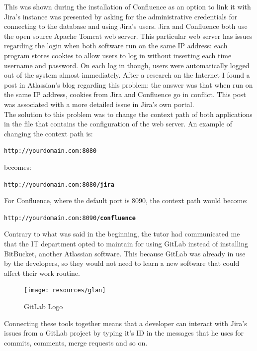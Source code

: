 	This was shown during the installation of Confluence as an option to link it with Jira's instance was presented by asking for the administrative credentials for connecting to the database and using Jira's users.
	Jira and Confluence both use the open source Apache Tomcat web server.
	This particular web server has issues regarding the login when both software run on the same IP address: each program stores \gls{cookies} to allow users to log in without inserting each time username and password.
	On each log in though, users were automatically logged out of the system almost immediately.
	After a research on the Internet I found a post\cite{user-is-constantly-logged-out-of-jira} in Atlassian's blog regarding this problem: the answer was that when run on the same IP address, cookies from Jira and Confluence go in conflict.
	This post was associated with a more detailed issue\cite{JRASERVER-36960} in Jira's own portal.\\
	The solution to this problem was to change the \gls{context path} of both applications\cite{how-to-change-the-jira-application-context-path} in the  file that contains the configuration of the web server.
	An example of changing the context path is:
	\begin{center}
		\texttt{http://yourdomain.com:8080}
	\end{center}
	\vspace{-10pt}
	becomes:
	\vspace{-10pt}
	\begin{center}
		\texttt{http://yourdomain.com:8080\textbf{/jira}}
	\end{center}
	For Confluence, where the default port is 8090, the context path would become:
	\begin{center}
		\texttt{http://yourdomain.com:8090\textbf{/confluence}}
	\end{center}
	Contrary to what was said in the beginning, the tutor had communicated me that the IT department opted to maintain for using GitLab\cite{gitlab} instead of installing BitBucket\cite{bitbucket}, another Atlassian software.	
	This because GitLab was already in use by the developers, so they would not need to learn a new software that could affect their work routine.
	\begin{figure}[H]
		\centering
		\texttt{[image: resources/glan]}\\
		\caption{GitLab Logo}
	\end{figure}
	Connecting these tools together means that a developer can interact with Jira's issues from a GitLab project by typing it's ID in the messages that he uses for commits, comments, merge requests and so on.
